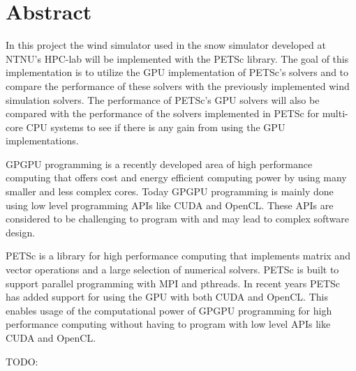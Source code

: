 \section*{Abstract}

In this project the wind simulator used in the snow simulator developed at
NTNU's HPC-lab will be implemented with the PETSc library. The goal of this
implementation is to utilize the GPU implementation of PETSc's solvers and to
compare the performance of these solvers with the previously implemented wind
simulation solvers. The performance of PETSc's GPU solvers will also be compared
with the performance of the solvers implemented in PETSc for multi-core CPU
systems to see if there is any gain from using the GPU implementations.

GPGPU programming is a recently developed area of high performance computing that
offers cost and energy efficient computing power by using many smaller and less
complex cores. Today GPGPU programming is mainly done using low level programming
APIs like CUDA and OpenCL. These APIs are considered to be challenging to
program with and may lead to complex software design.

PETSc is a library for high performance computing that implements matrix and vector
operations and a large selection of numerical solvers. PETSc is built to support
parallel programming with MPI and pthreads. In recent years PETSc has added
support for using the GPU with both CUDA and OpenCL. This enables usage of the
computational power of GPGPU programming for high performance
computing without having to program with low level APIs like CUDA and OpenCL.

TODO:
